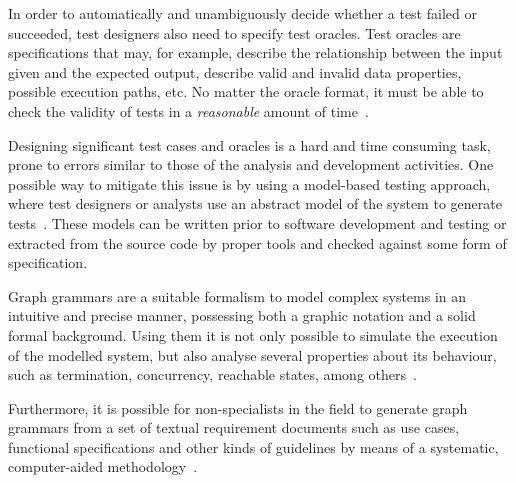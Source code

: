 In order to automatically and unambiguously decide whether a test failed or succeeded, test designers also need to specify test oracles. Test oracles are specifications that may, for example, describe the relationship between the input given and the expected output, describe valid and invalid data properties, possible execution paths, etc. No matter the oracle format, it must be able to check the validity of tests in a \textit{reasonable} amount of time~\cite{Weyuker1982}.

Designing significant test cases and oracles is a hard and time consuming task, prone to errors similar to those of the analysis and development activities. One possible way to mitigate this issue is by using a model-based testing approach, where test designers or analysts use an abstract model of the system to generate tests~\cite{Utting2006}. These models can be written prior to software development and testing or extracted from the source code by proper tools and checked against some form of specification.


Graph grammars are a suitable formalism to model complex systems in an intuitive and precise manner, possessing both a graphic notation and a solid formal background.  Using them it is not only possible to simulate the execution of the modelled system, but also analyse several properties about its behaviour, such as termination, concurrency, reachable states, among others~\cite{Ehrig2006}.


Furthermore, it is possible for non-specialists in the field to generate graph grammars from a set of textual requirement documents such as use cases, functional specifications and other kinds of guidelines by means of a systematic, computer-aided methodology~\cite{Junior2015,BezerraWEIT2016,Cota2017}.

